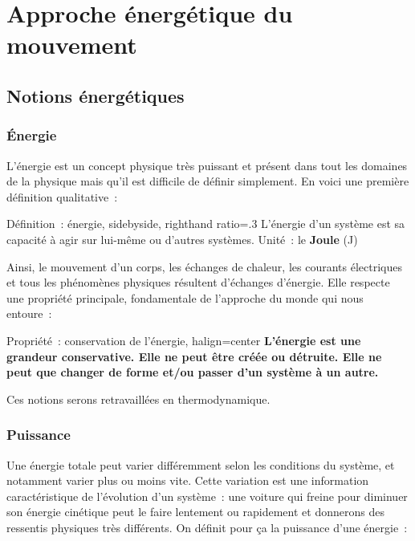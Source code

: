 \documentclass[../main/main.tex]{subfiles}
\begin{document}
\setcounter{chapter}{3}

\chapter{Approche \'energ\'etique du mouvement}

\section{Notions énergétiques}
\subsection{Énergie}
L’énergie est un concept physique très puissant et présent dans tout les
domaines de la physique mais qu’il est difficile de définir simplement. En voici
une première définition qualitative~:
\begin{tdefi}{Définition~: énergie, sidebyside, righthand ratio=.3}
    L’énergie d’un système est sa capacité à agir sur lui-même ou d’autres
    systèmes.
    \tcblower
    Unité~: le \textbf{Joule} (J)
\end{tdefi}

Ainsi, le mouvement d'un corps, les échanges de chaleur, les courants
électriques et tous les phénomènes physiques résultent d'échanges d'énergie.
Elle respecte une propriété principale, fondamentale de l'approche du monde qui
nous entoure~:

\begin{tprop}{Propriété~: conservation de l'énergie, halign=center}
    \bfseries
    L’énergie est une grandeur conservative. Elle ne peut être créée ou
    détruite. Elle ne peut que changer de forme et/ou passer d’un système à un
    autre.
\end{tprop}

Ces notions serons retravaillées en thermodynamique.

\vspace{-10pt}
\subsection{Puissance}

Une énergie totale peut varier différemment selon les conditions du système, et
notamment varier plus ou moins vite. Cette variation est une information
caractéristique de l'évolution d'un système~: une voiture qui freine pour
diminuer son énergie cinétique peut le faire lentement ou rapidement et
donnerons des ressentis physiques très différents. On définit pour ça la
puissance d'une énergie~:
\end{document}
